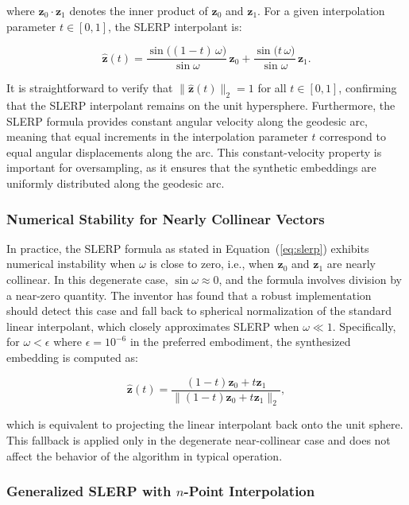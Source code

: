 \documentclass[12pt,letterpaper]{article}
\newcommand{\bz}{\mathbf{z}}
\begin{document}
\noindent where $\bz_0 \cdot \bz_1$ denotes the inner product of $\bz_0$ and
$\bz_1$. For a given interpolation parameter $t \in [0,1]$, the SLERP
interpolant is:

\begin{equation}
  \hat{\bz}(t) = \frac{\sin\bigl((1-t)\,\omega\bigr)}{\sin\omega}\,\bz_0
                + \frac{\sin\bigl(t\,\omega\bigr)}{\sin\omega}\,\bz_1.
  \label{eq:slerp}
\end{equation}

\noindent It is straightforward to verify that $\|\hat{\bz}(t)\|_2 = 1$ for
all $t \in [0,1]$, confirming that the SLERP interpolant remains on the unit
hypersphere. Furthermore, the SLERP formula provides constant angular velocity
along the geodesic arc, meaning that equal increments in the interpolation
parameter $t$ correspond to equal angular displacements along the arc. This
constant-velocity property is important for oversampling, as it ensures that
the synthetic embeddings are uniformly distributed along the geodesic arc.

\subsubsection{Numerical Stability for Nearly Collinear Vectors}

In practice, the SLERP formula as stated in Equation~(\ref{eq:slerp}) exhibits
numerical instability when $\omega$ is close to zero, i.e., when $\bz_0$ and
$\bz_1$ are nearly collinear. In this degenerate case, $\sin\omega \approx 0$,
and the formula involves division by a near-zero quantity. The inventor has
found that a robust implementation should detect this case and fall back to
spherical normalization of the standard linear interpolant, which closely
approximates SLERP when $\omega \ll 1$. Specifically, for $\omega < \epsilon$
where $\epsilon = 10^{-6}$ in the preferred embodiment, the synthesized
embedding is computed as:

\begin{equation}
  \hat{\bz}(t) = \frac{(1-t)\bz_0 + t\bz_1}{\|(1-t)\bz_0 + t\bz_1\|_2},
  \label{eq:slerp_fallback}
\end{equation}

\noindent which is equivalent to projecting the linear interpolant back onto the
unit sphere. This fallback is applied only in the degenerate near-collinear
case and does not affect the behavior of the algorithm in typical operation.

\subsubsection{Generalized SLERP with $n$-Point Interpolation}
\end{document}
